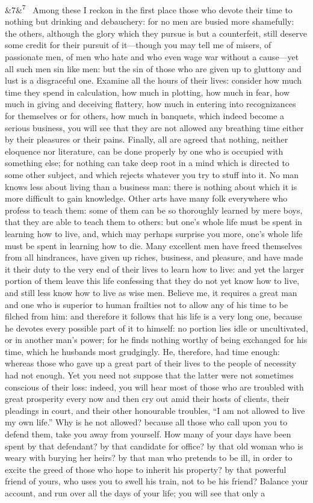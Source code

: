 \documentclass[12pt]{article}
\newcommand{\para}[1][]{\par\noindent\ifx&#1&\else\textsuperscript{\footnotesize #1}~\fi}
\begin{document}
\para[7] Among these I reckon in the first place those who devote their time to nothing but drinking and debauchery: for no men are busied more shamefully: the others, although the glory which they pursue is but a counterfeit, still deserve some credit for their pursuit of it—though you may tell me of misers, of passionate men, of men who hate and who even wage war without a cause—yet all such men sin like men: but the sin of those who are given up to gluttony and lust is a disgraceful one. Examine all the hours of their lives: consider how much time they spend in calculation, how much in plotting, how much in fear, how much in giving and deceiving flattery, how much in entering into recognizances for themselves or for others, how much in banquets, which indeed become a serious business, you will see that they are not allowed any breathing time either by their pleasures or their pains. Finally, all are agreed that nothing, neither eloquence nor literature, can be done properly by one who is occupied with something else; for nothing can take deep root in a mind which is directed to some other subject, and which rejects whatever you try to stuff into it. No man knows less about living than a business man: there is nothing about which it is more difficult to gain knowledge. Other arts have many folk everywhere who profess to teach them: some of them can be so thoroughly learned by mere boys, that they are able to teach them to others: but one’s whole life must be spent in learning how to live, and, which may perhaps surprise you more, one’s whole life must be spent in learning how to die. Many excellent men have freed themselves from all hindrances, have given up riches, business, and pleasure, and have made it their duty to the very end of their lives to learn how to live: and yet the larger portion of them leave this life confessing that they do not yet know how to live, and still less know how to live as wise men. Believe me, it requires a great man and one who is superior to human frailties not to allow any of his time to be filched from him: and therefore it follows that his life is a very long one, because he devotes every possible part of it to himself: no portion lies idle or uncultivated, or in another man’s power; for he finds nothing worthy of being exchanged for his time, which he husbands most grudgingly. He, therefore, had time enough: whereas those who gave up a great part of their lives to the people of necessity had not enough. Yet you need not suppose that the latter were not sometimes conscious of their loss: indeed, you will hear most of those who are troubled with great prosperity every now and then cry out amid their hosts of clients, their pleadings in court, and their other honourable troubles, “I am not allowed to live my own life.” Why is he not allowed? because all those who call upon you to defend them, take you away from yourself. How many of your days have been spent by that defendant? by that candidate for office? by that old woman who is weary with burying her heirs? by that man who pretends to be ill, in order to excite the greed of those who hope to inherit his property? by that powerful friend of yours, who uses you to swell his train, not to be his friend? Balance your account, and run over all the days of your life; you will see that only a 
\end{document}
